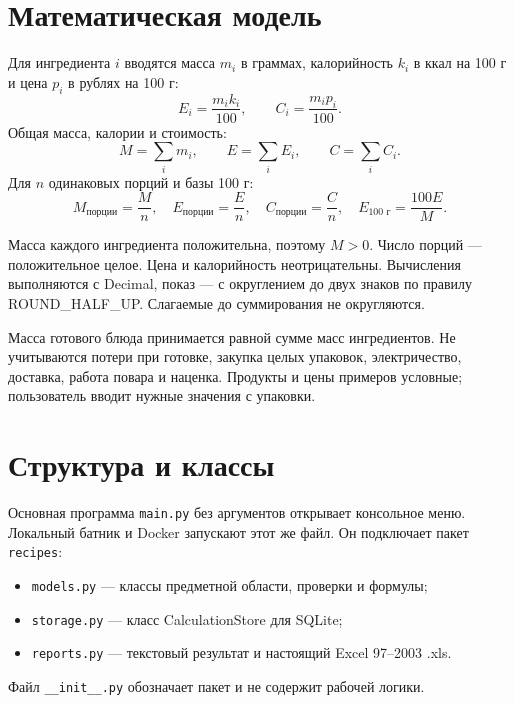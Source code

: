 \documentclass[12pt,a4paper]{article}
\begin{document}
\section{Математическая модель}
Для ингредиента $i$ вводятся масса $m_i$ в граммах, калорийность $k_i$ в ккал
на 100 г и цена $p_i$ в рублях на 100 г:
\[
 E_i=\frac{m_i k_i}{100},\qquad
 C_i=\frac{m_i p_i}{100}.
\]
Общая масса, калории и стоимость:
\[
 M=\sum_i m_i,\qquad E=\sum_i E_i,\qquad C=\sum_i C_i.
\]
Для $n$ одинаковых порций и базы 100 г:
\[
 M_{\text{порции}}=\frac{M}{n},\quad
 E_{\text{порции}}=\frac{E}{n},\quad
 C_{\text{порции}}=\frac{C}{n},\quad
 E_{100\text{ г}}=\frac{100E}{M}.
\]

Масса каждого ингредиента положительна, поэтому $M>0$. Число порций ---
положительное целое. Цена и калорийность неотрицательны.
Вычисления выполняются с Decimal, показ --- с округлением до двух знаков
по правилу ROUND\_HALF\_UP. Слагаемые до суммирования не округляются.

Масса готового блюда принимается равной сумме масс ингредиентов.
Не учитываются потери при готовке, закупка целых упаковок, электричество,
доставка, работа повара и наценка. Продукты и цены примеров условные;
пользователь вводит нужные значения с упаковки.

\section{Структура и классы}
Основная программа \texttt{main.py} без аргументов открывает консольное меню.
Локальный батник и Docker запускают этот же файл. Он подключает пакет \texttt{recipes}:
\begin{itemize}
\item \texttt{models.py} --- классы предметной области, проверки и формулы;
\item \texttt{storage.py} --- класс CalculationStore для SQLite;
\item \texttt{reports.py} --- текстовый результат и настоящий Excel 97--2003 .xls.
\end{itemize}
Файл \texttt{\_\_init\_\_.py} обозначает пакет и не содержит рабочей логики.
\end{document}
